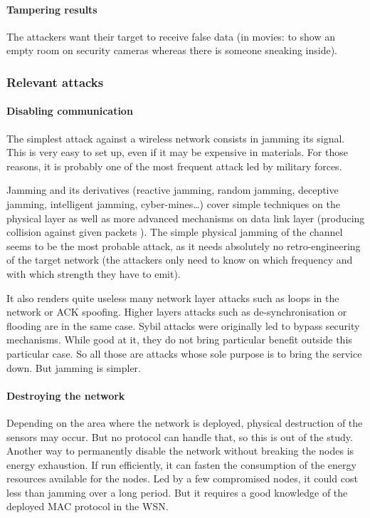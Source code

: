 \paragraph{Tampering results}
The attackers want their target to receive false data (\eg in movies: to show an empty room on security cameras whereas there is someone sneaking inside).

\subsubsection{Relevant attacks}

\paragraph{Disabling communication}
The simplest \dos attack against a wireless network consists in jamming its signal.
This is very easy to set up, even if it may be expensive in materials.
For those reasons, it is probably one of the most frequent attack led by military forces.

Jamming and its derivatives (reactive jamming, random jamming, deceptive jamming, intelligent jamming, cyber-mines\dots) cover simple techniques on the physical layer as well as more advanced mechanisms on data link layer (producing collision against given packets \etc).
The simple physical jamming of the channel seems to be the most probable attack, as it needs absolutely no retro-engineering of the target network (the attackers only need to know on which frequency and with which strength they have to emit).

It also renders quite useless many network layer \dos attacks such as loops in the network or ACK spoofing.
Higher layers attacks such as de-synchronisation or flooding are in the same case.
Sybil attacks were originally led to bypass security mechanisms.
While good at it, they do not bring particular benefit outside this particular case.
So all those are attacks whose sole purpose is to bring the service down.
But jamming is simpler.

\paragraph{Destroying the network}
Depending on the area where the network is deployed, physical destruction of the sensors may occur.
But no protocol can handle that, so this is out of the study.
Another way to permanently disable the network without breaking the nodes is energy exhaustion.
If run efficiently, it can fasten the consumption of the energy resources available for the nodes.
Led by a few compromised nodes, it could cost less than jamming over a long period.
But it requires a good knowledge of the deployed MAC protocol in the WSN.

